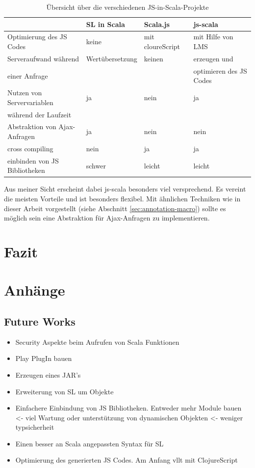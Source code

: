 \documentclass[12pt]{scrreprt}
\begin{document}
\begin{table}[ht]
\caption{Übersicht über die verschiedenen JS-in-Scala-Projekte}
\centering
\begin{tabular}{llll}
      & SL in Scala &  Scala.js              &    js-scala \\
 \midrule
Optimierung des JS Codes  &  keine  &  mit cloureScript & mit Hilfe von LMS\\
\addlinespace
Serveraufwand während & Wertübersetzung & keinen & erzeugen und  \\
einer Anfrage &  & & optimieren des JS Codes\\
\addlinespace
Nutzen von Servervariablen  & ja & nein & ja \\
während der Laufzeit & \\
\addlinespace
Abstraktion von Ajax-Anfragen & ja & nein & nein \\
\addlinespace
cross compiling & nein & ja & ja \\
\addlinespace
einbinden von JS Bibliotheken & schwer & leicht & leicht \\

\end{tabular}
\label{tab:related-work-overview}
\end{table}

Aus meiner Sicht erscheint dabei js-scala besonders viel versprechend. Es vereint die meisten Vorteile und ist besonders flexibel. Mit ähnlichen Techniken wie in dieser Arbeit vorgestellt (siehe Abschnitt \ref{sec:annotation-macro}) sollte es möglich sein eine Abstraktion für Ajax-Anfragen zu implementieren.

\chapter{Fazit}
\label{chap:conclusion}

\appendix
\chapter{Anhänge}
\label{chap:anhänge}

\section{Future Works}
\label{sec:future-works}

\begin{itemize}
 \item{Security Aspekte beim Aufrufen von Scala Funktionen}
 \item{Play PlugIn bauen}
 \item{Erzeugen eines JAR's}
 \item{Erweiterung von SL um Objekte}
 \item{Einfachere Einbindung von JS Bibliotheken. Entweder mehr Module bauen <- viel Wartung oder unterstützung von dynamischen Objekten <- weniger typsicherheit}
 \item{Einen besser an Scala angepassten Syntax für SL}
 \item{Optimierung des generierten JS Codes. Am Anfang vllt mit ClojureScript}
\end{itemize}
\end{document}
